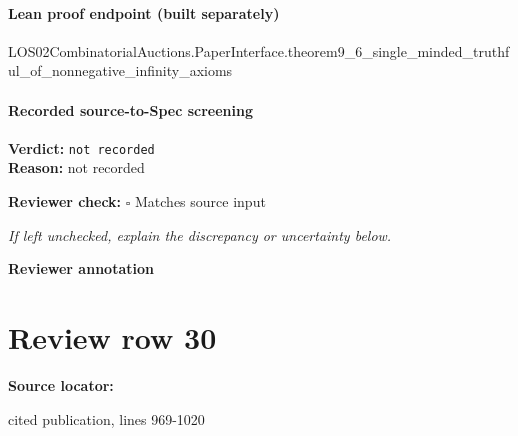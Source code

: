 \documentclass[10pt]{article}
\newcommand{\reviewerbox}{%
  \par\noindent\fbox{\parbox{0.96\linewidth}{\rule{0pt}{0.38in}}}\par
}
\newcommand{\reviewmatch}[1]{%
  \par\noindent\textbf{Reviewer check:} $\square$\; #1\par
  \noindent\emph{If left unchecked, explain the discrepancy or uncertainty below.}\par
}
\begin{document}
\paragraph{Lean proof endpoint (built separately)}\begin{ReviewVerbatim}
LOS02CombinatorialAuctions.PaperInterface.theorem9_6_single_minded_truthful_of_nonnegative_infinity_axioms
\end{ReviewVerbatim}

\paragraph{Recorded source-to-Spec screening}
\textbf{Verdict:} \texttt{not recorded}
\\
\textbf{Reason:} not recorded
\reviewmatch{Matches source input}
\noindent\textbf{Reviewer annotation}\par
\reviewerbox
\clearpage
\hypertarget{source-claim-4a20770856e8ccb4}{}
\section*{Review row 30}
\textbf{Source locator:} {\footnotesize\raggedright cited publication, lines 969-\allowbreak{}1020\par}
\end{document}
